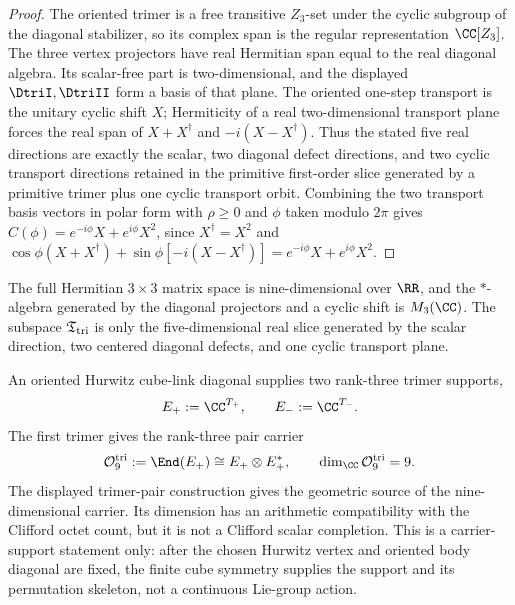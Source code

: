 \documentclass[11pt]{article}
\begin{document}
\begin{proof}
The oriented trimer is a free transitive \(Z_3\)-set under the cyclic subgroup of
the diagonal stabilizer, so its complex span is the regular representation
\(\CC[Z_3]\).  The three vertex projectors have real Hermitian span equal to the
real diagonal algebra.  Its scalar-free part is two-dimensional, and the displayed
\(\DtriI,\DtriII\) form a basis of that plane.  The oriented one-step transport is the
unitary cyclic shift \(X\); Hermiticity of a real two-dimensional transport plane
forces the real span of \(X+X^\dagger\) and \(-i(X-X^\dagger)\).  Thus the stated
five real directions are exactly the scalar, two diagonal defect directions, and
two cyclic transport directions retained in the primitive first-order slice
generated by a primitive trimer plus one cyclic transport orbit.  Combining the two transport basis vectors in polar form with \(\rho\ge0\) and
\(\phi\) taken modulo \(2\pi\) gives
\(C(\phi)=e^{-i\phi}X+e^{i\phi}X^2\), since
\(X^\dagger=X^2\) and
\(\cos\phi(X+X^\dagger)+\sin\phi[-i(X-X^\dagger)]
=e^{-i\phi}X+e^{i\phi}X^2\).
\end{proof}



\begin{remark}
The full Hermitian \(3\times3\) matrix space is nine-dimensional over
\(\RR\), and the \(*\)-algebra generated by the diagonal projectors and a cyclic
shift is \(M_3(\CC)\).  The subspace \(\mathfrak T_{\rm tri}\) is only the
five-dimensional real slice generated by the scalar direction, two centered
diagonal defects, and one cyclic transport plane.
\end{remark}

\begin{corollary}
\label{p1:cor:finite-trimer-pair-supports}
An oriented Hurwitz cube-link diagonal supplies two rank-three trimer supports,
\[
    E_+:=\CC^{T_+},
    \qquad
    E_-:=\CC^{T_-}.
\]
The first trimer gives the rank-three pair carrier
\[
    \mathcal O_9^{\rm tri}
    :=\End(E_+)
    \cong E_+\otimes E_+^*,
    \qquad
    \dim_\CC\mathcal O_9^{\rm tri}=9.
\]
The displayed trimer-pair construction gives the geometric source of the
nine-dimensional carrier.  Its dimension has an arithmetic compatibility with
the Clifford octet count, but it is not a Clifford scalar completion.  This is a carrier-support statement only:
after the chosen Hurwitz vertex and oriented body diagonal are fixed, the finite
cube symmetry supplies the support and its permutation skeleton, not a continuous
Lie-group action.
\end{corollary}
\end{document}
